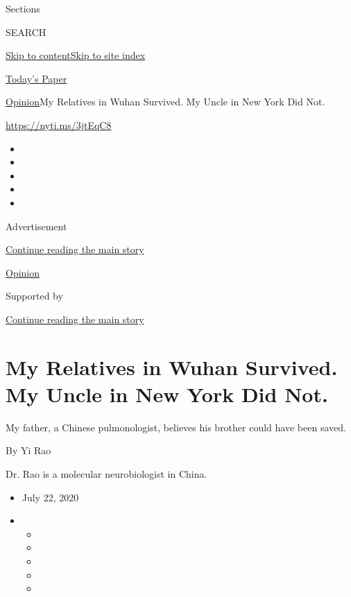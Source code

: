 Sections

SEARCH

\protect\hyperlink{site-content}{Skip to
content}\protect\hyperlink{site-index}{Skip to site index}

\href{https://myaccount.nytimes3xbfgragh.onion/auth/login?response_type=cookie\&client_id=vi}{}

\href{https://www.nytimes3xbfgragh.onion/section/todayspaper}{Today's
Paper}

\href{/section/opinion}{Opinion}\textbar{}My Relatives in Wuhan
Survived. My Uncle in New York Did Not.

\url{https://nyti.ms/3jtEqC8}

\begin{itemize}
\item
\item
\item
\item
\item
\end{itemize}

Advertisement

\protect\hyperlink{after-top}{Continue reading the main story}

\href{/section/opinion}{Opinion}

Supported by

\protect\hyperlink{after-sponsor}{Continue reading the main story}

\hypertarget{my-relatives-in-wuhan-survived-my-uncle-in-new-york-did-not}{%
\section{My Relatives in Wuhan Survived. My Uncle in New York Did
Not.}\label{my-relatives-in-wuhan-survived-my-uncle-in-new-york-did-not}}

My father, a Chinese pulmonologist, believes his brother could have been
saved.

By Yi Rao

Dr. Rao is a molecular neurobiologist in China.

\begin{itemize}
\item
  July 22, 2020
\item
  \begin{itemize}
  \item
  \item
  \item
  \item
  \item
  \end{itemize}
\end{itemize}


